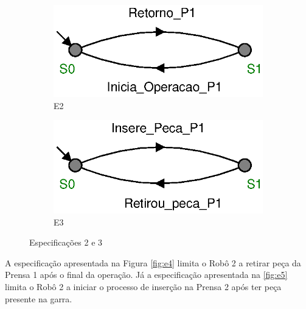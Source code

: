 \begin{figure}[H]%
  \centering
  \begin{subfigure}[b]{0.45\textwidth}
      \centering
      \includegraphics[width=\textwidth]{imagens/E2.eps}
      \caption{E2}
      \label{fig:e2}
  \end{subfigure}
  \hfill
  \begin{subfigure}[b]{0.45\textwidth}
      \centering
      \includegraphics[width=\textwidth]{imagens/E3.eps}
      \caption{E3}
      \label{fig:e3}
  \end{subfigure}
  \caption{Especificações 2 e 3}
  \label{fig:e23}
\end{figure}

A especificação apresentada na Figura \ref{fig:e4} limita o Robô 2 a retirar peça da Prensa 1 após o final da operação.
Já a especificação apresentada na \ref{fig:e5} limita o Robô 2 a iniciar o processo de inserção na Prensa 2 após ter peça presente na garra.

